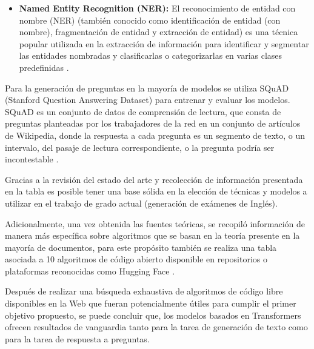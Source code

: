 \documentclass[../Main.tex]{subfiles}
\begin{document}
\begin{itemize}
    
    \item \textbf{Named Entity Recognition (NER):} El reconocimiento de entidad con nombre (NER) (también conocido como identificación de entidad (con nombre), fragmentación de entidad y extracción de entidad) es una técnica popular utilizada en la extracción de información para identificar y segmentar las entidades nombradas y clasificarlas o categorizarlas en varias clases predefinidas \cite{40}.
\end{itemize}\par


\begin{justify}
Para la generación de preguntas en la mayoría de modelos se utiliza SQuAD (Stanford Question Answering Dataset) para entrenar y evaluar los modelos. SQuAD es un conjunto de datos de comprensión de lectura, que consta de preguntas planteadas por los trabajadores de la red en un conjunto de artículos de Wikipedia, donde la respuesta a cada pregunta es un segmento de texto, o un intervalo, del pasaje de lectura correspondiente, o la pregunta podría ser incontestable \cite{41}.
\end{justify}

\begin{justify}
Gracias a la revisión del estado del arte y recolección de información presentada en la tabla es posible tener una base sólida en la elección de técnicas y modelos a utilizar en el trabajo de grado actual (generación de exámenes de Inglés).
\end{justify}

\begin{justify}
Adicionalmente, una vez obtenida las fuentes teóricas, se recopiló información de manera más específica sobre algoritmos que se basan en la teoría presente en la mayoría de documentos, para este propósito también se realiza una tabla asociada a 10 algoritmos de código abierto disponible en repositorios o plataformas reconocidas como Hugging Face \cite{42}.
\end{justify}

\begin{justify}
Después de realizar una búsqueda exhaustiva de algoritmos de código libre disponibles en la Web que fueran potencialmente útiles para cumplir el primer objetivo propuesto, se puede concluir que, los modelos basados en Transformers ofrecen resultados de vanguardia tanto para la tarea de generación de texto como para la tarea de respuesta a preguntas. 
\end{justify}
\end{document}

